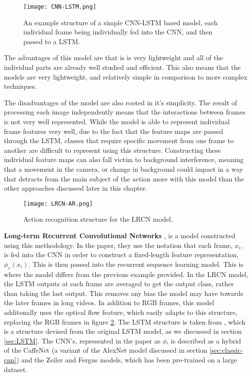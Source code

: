\begin{figure}[ht]
	\texttt{[image: CNN-LSTM.png]}
	\centering
	\caption{An example structure of a simple CNN-LSTM based model, each individual frame being individually fed into the CNN, and then passed to a LSTM.}
	\label{fig:cnn-lstm}
\end{figure}

The advantages of this model are that is is very lightweight and all of the individual parts are already well studied and efficient. This also means that the models are very lightweight, and relatively simple in comparison to more complex techniques.

The disadvantages of the model are also rooted in it's simplicity. The result of processing each image independently means that the interactions between frames is not very well represented. While the model is able to represent individual frame features very well, due to the fact that the feature maps are passed through the LSTM, classes that require specific movement from one frame to another are difficult to represent using this structure. Constructing these individual feature maps can also fall victim to background interference, meaning that a movement in the camera, or change in background could impact in a way that detracts from the main subject of the action more with this model than the other approaches discussed later in this chapter.

\begin{figure}[ht]
	\texttt{[image: LRCN-AR.png]}
	\centering
	\caption{Action recognition structure for the LRCN model. \cite{LRCNS}}
	\label{fig:lrcn-ar}
\end{figure}

\textbf{Long-term Recurrent Convolutional Networks} \cite{LRCNS}, is a model constructed using this methodology. In the paper, they use the notation that each frame, $x_{i}$, is fed into the CNN in order to construct a fixed-length feature representation, $\phi_{v}(x_{i})$. This is then passed into the recurrent sequence learning model. This is where the model differs from the previous example provided. In the LRCN model, the LSTM outputs at each frame are averaged to get the output class, rather than taking the last output. This removes any bias the model may have towards the later frames in long videos. In addition to RGB frames, this model additonally uses the optical flow feature, which easily adapts to this structure, replacing the RGB frames in figure \ref{fig:lrcn-ar}. The LSTM structure is taken from \cite{LSTM-2015}, which is a structure devised from the original LSTM model, as we discussed in section \ref{sec:LSTM}. The CNN's, represented in the paper as $\phi$, is described as a hybrid of the CaffeNet \cite{caffenet} (a variant of the AlexNet \cite{alexnet} model discussed in section \ref{sec:classic-cnn}) and the Zeiler and Fergus \cite{zeilerfergus} models, which has been pre-trained on a large dataset.

